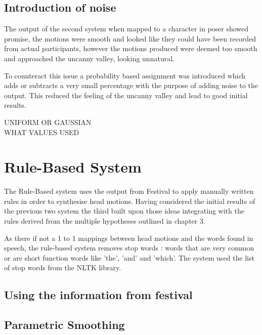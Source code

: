 \documentclass[bsc,frontabs,twoside,singlespacing,parskip]{infthesis}
\begin{document}
\subsection{Introduction of noise}

The output of the second system when mapped to a character in poser showed promise, the motions were smooth and looked like they could have been recorded from actual participants, however the motions produced were deemed too smooth and approached the uncanny valley, looking unnatural.

To counteract this issue a probability based assignment was introduced which adds or subtracts a very small percentage with the purpose of adding noise to the output. This reduced the feeling of the uncanny valley and lead to good initial results.

UNIFORM OR GAUSSIAN \\
WHAT VALUES USED \\


\section{Rule-Based System}

The Rule-Based system uses the output from Festival to apply manually written rules in order to synthesise head motions. Having considered the initial results of the previous two system the third built upon those ideas integrating with the rules derived from the multiple hypotheses outlined in chapter 3.

As there if not a 1 to 1 mappings between head motions and the words found in speech, the rule-based system removes stop words : words that are very common or are short function words like 'the', 'and' and 'which'. The system used the list of stop words from the NLTK library.

\subsection{Using the information from festival}

\subsection{Parametric Smoothing}
\end{document}
